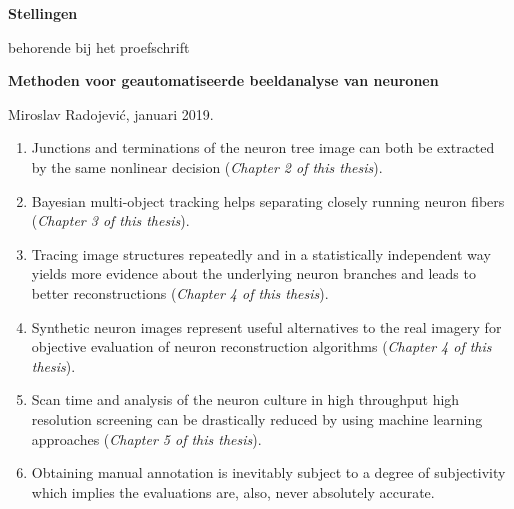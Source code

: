 \documentclass[10pt]{report}
\begin{document}
\pagestyle{empty}
\setlength{\leftmargini}{0em}

\begin{center}
  {\Large\bf Stellingen}

  \medskip

  behorende bij het proefschrift

  \medskip

  {\large\bf  Methoden voor geautomatiseerde beeldanalyse van neuronen}

  \medskip

  Miroslav Radojevi\'{c}, januari 2019.
\end{center}

\bigskip
\small

\begin{enumerate}
  
\item Junctions and terminations of the neuron tree image can both be extracted by the same nonlinear decision (\emph{Chapter 2 of this thesis}).

\medskip
  
\item Bayesian multi-object tracking helps separating closely running neuron fibers (\emph{Chapter 3 of this thesis}).  
\medskip

\item Tracing image structures repeatedly and in a statistically independent way yields more evidence about the underlying neuron branches and leads to better reconstructions (\emph{Chapter 4 of this thesis}).
	
\medskip

\item Synthetic neuron images represent useful alternatives to the real imagery for objective evaluation of neuron reconstruction algorithms (\emph{Chapter 4 of this thesis}).

\medskip

\item Scan time and analysis of the neuron culture in high throughput high resolution screening can be drastically reduced by using machine learning approaches (\emph{Chapter 5 of this thesis}).

\medskip

\item Obtaining manual annotation is inevitably subject to a degree of subjectivity which implies the evaluations are, also, never absolutely accurate.
 

\end{enumerate}
\end{document}
